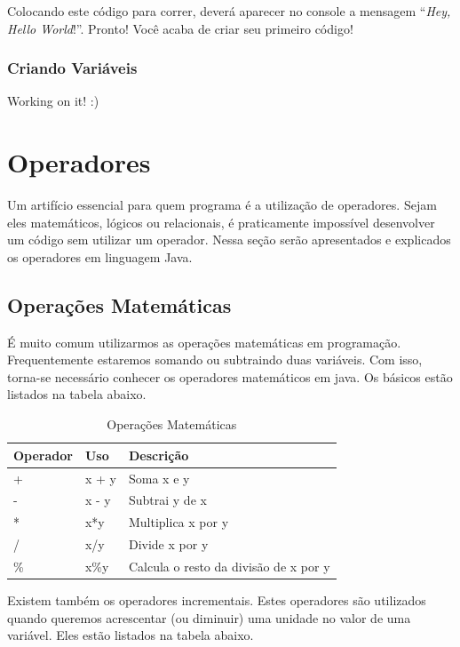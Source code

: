 \documentclass[
]{book}
\begin{document}
Colocando este código para correr, deverá aparecer no console a mensagem ``\emph{Hey, Hello World}!''. Pronto! Você acaba de criar seu primeiro código!

\hypertarget{criando-variuxe1veis}{%
\subsection{Criando Variáveis}\label{criando-variuxe1veis}}

Working on it! :)

\hypertarget{operadores}{%
\chapter{Operadores}\label{operadores}}

Um artifício essencial para quem programa é a utilização de operadores. Sejam eles matemáticos, lógicos ou relacionais, é praticamente impossível desenvolver um código sem utilizar um operador. Nessa seção serão apresentados e explicados os operadores em linguagem Java.

\hypertarget{operauxe7uxf5es-matemuxe1ticas}{%
\section{Operações Matemáticas}\label{operauxe7uxf5es-matemuxe1ticas}}

É muito comum utilizarmos as operações matemáticas em programação. Frequentemente estaremos somando ou subtraindo duas variáveis. Com isso, torna-se necessário conhecer os operadores matemáticos em java. Os básicos estão listados na tabela abaixo.

\begin{table}

\caption{\label{tab:unnamed-chunk-4}Operações Matemáticas}
\centering
\begin{tabular}[t]{l|l|l}
\hline
Operador & Uso & Descrição\\
\hline
+ & x + y & Soma x e y\\
\hline
- & x - y & Subtrai y de x\\
\hline
* & x*y & Multiplica x por y\\
\hline
/ & x/y & Divide x por y\\
\hline
\% & x\%y & Calcula o resto da divisão de x por y\\
\hline
\end{tabular}
\end{table}

Existem também os operadores incrementais. Estes operadores são utilizados quando queremos acrescentar (ou diminuir) uma unidade no valor de uma variável. Eles estão listados na tabela abaixo.
\end{document}
